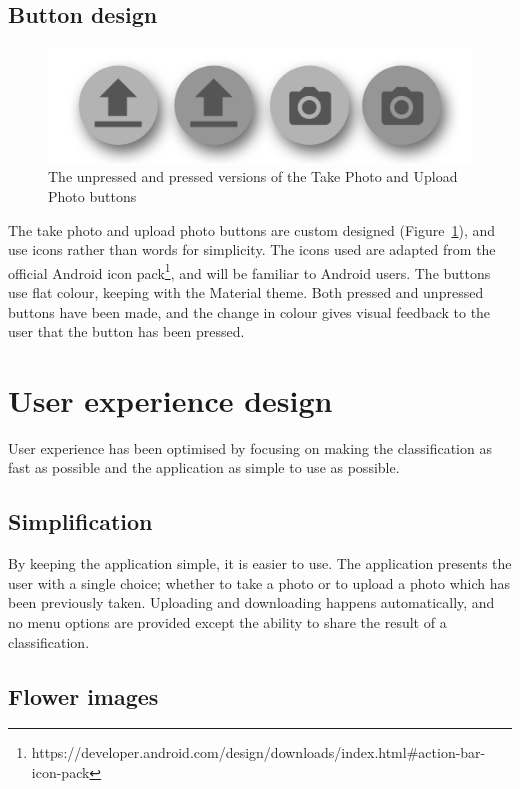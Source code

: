 \documentclass[11pt, a4paper]{report}
\begin{document}
\subsection{Button design}

\begin{figure}[hbt]
	\centering
  \includegraphics[totalheight=3cm]{img/13.png}
  \caption{The unpressed and pressed versions of the Take Photo and Upload Photo buttons}
  \label{img:13}
\end{figure}

The take photo and upload photo buttons are custom designed (Figure~\ref{img:13}), and use icons rather than words for simplicity. The icons used are adapted from the official Android icon pack\footnote{https://developer.android.com/design/downloads/index.html\#action-bar-icon-pack}, and will be familiar to Android users. The buttons use flat colour, keeping with the Material theme. Both pressed and unpressed buttons have been made, and the change in colour gives visual feedback to the user that the button has been pressed. 

\section{User experience design}

User experience has been optimised by focusing on making the classification as fast as possible and the application as simple to use as possible. 

\subsection{Simplification}

By keeping the application simple, it is easier to use. The application presents the user with a single choice; whether to take a photo or to upload a photo which has been previously taken. Uploading and downloading happens automatically, and no menu options are provided except the ability to share the result of a classification. 

\subsection{Flower images}
\end{document}
